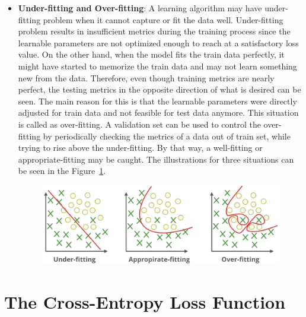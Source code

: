 \begin{itemize}
	\item \textbf{Under-fitting and Over-fitting}: A learning algorithm may have under-fitting problem when it cannot capture or fit the data well. Under-fitting problem results in insufficient metrics during the training process since the learnable parameters are not optimized enough to reach at a satisfactory loss value. On the other hand, when the model fits the train data perfectly, it might have started to memorize the train data and may not learn something new from the data. Therefore, even though training metrics are nearly perfect, the testing metrics in the opposite direction of what is desired can be seen. The main reason for this is that the learnable parameters were directly adjusted for train data and not feasible for test data anymore. This situation is called as over-fitting. A validation set can be used to control the over-fitting by periodically checking the metrics of a data out of train set, while trying to rise above the under-fitting. By that way, a well-fitting or appropriate-fitting may be caught. The illustrations for three situations can be seen in the Figure~\ref{fig:underfitting_overfitting}.
	
	\begin{figure}[h]
		\centering
		\includegraphics[width=1\linewidth]{fig/underfitting_overfitting.png}
		\vspace*{1mm}
		\label{fig:underfitting_overfitting}
	\end{figure}
	
\end{itemize}

\section{The Cross-Entropy Loss Function}\label{sec:CH3_cross_entropy}

